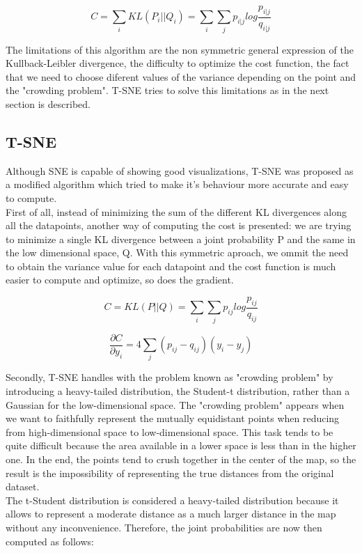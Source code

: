 \documentclass[a4paper,11pt,spanish]{report}
\begin{document}
$$ C = \sum\limits_{i} KL(P_{i}||Q_{i}) = \sum\limits_{i} \sum\limits_{j} p_{i|j} log \frac{p_{i|j}}{q_{i|j}}$$

The limitations of this algorithm are the non symmetric general expression of the Kullback-Leibler divergence, the difficulty to optimize the cost function, the fact that we need to choose diferent values of the variance depending on the point and the "crowding problem". T-SNE tries to solve this limitations as in the next section is described.

\subsection{T-SNE}
\label{ssec:tsne}

Although SNE is capable of showing good visualizations, T-SNE was proposed as a modified algorithm which tried to make it's behaviour more accurate and easy to compute.\\
First of all, instead of minimizing the sum of the different KL divergences along all the datapoints, another way of computing the cost is presented: we are trying to minimize a single KL divergence between a joint probability P and the same in the low dimensional space, Q. With this symmetric aproach, we ommit the need to obtain the variance value for each datapoint and the cost function is much easier to compute and optimize, so does the gradient.

$$ C = KL(P||Q) = \sum\limits_{i} \sum\limits_{j} p_{ij} log \frac{p_{ij}}{q_{ij}}$$

$$ \frac{\partial C}{\partial y_{i}} = 4 \sum\limits_j (p_{ij} - q_{ij}) (y_{i} - y_{j}) $$

Secondly, T-SNE handles with the problem known as "crowding problem" by introducing a heavy-tailed distribution, the Student-t distribution, rather than a Gaussian for the low-dimensional space. The "crowding problem" appears when we want to faithfully represent the mutually equidistant points when reducing from high-dimensional space to low-dimensional space. This task tends to be quite difficult because the area available in a lower space is less than in the higher one. In the end, the points tend to crush together in the center of the map, so the result is the impossibility of representing the true distances from the original dataset.\\
The t-Student distribution is considered a heavy-tailed distribution because it allows to represent a moderate distance as a much larger distance in the map without any inconvenience.
Therefore, the joint probabilities are now then computed as follows:
\end{document}
